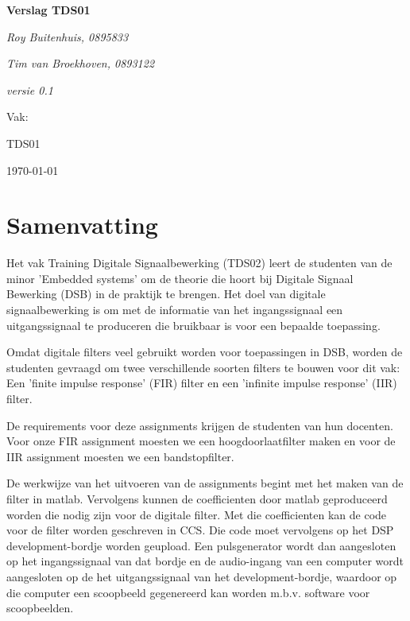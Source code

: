 \documentclass[11pt,a4paper]{article}
\def\auteureen{Roy Buitenhuis, 0895833}
\def\auteurtwee{Tim van Broekhoven, 0893122}
\def\titel{Verslag TDS01}
\def\datum{\today}
\def\versie{0.1}
\begin{document}
	
	\begin{titlepage}
		
		\centering
		{\huge\bfseries \titel \par}
		
		\vspace{1cm}
		{\Large\itshape \auteureen \par}
		{\Large\itshape \auteurtwee \par}
		\vspace{1cm}
		{\Large\itshape versie \versie\par}
				
		\vfill
		Vak:\par
		TDS01
		
		\vfill
		{\large \datum \par}
	\end{titlepage}

	\section{Samenvatting}

Het vak Training Digitale Signaalbewerking (TDS02) leert de studenten van de minor 'Embedded systems' om de theorie die hoort bij Digitale Signaal Bewerking (DSB) in de praktijk te brengen. Het doel van digitale signaalbewerking is om met de informatie van het ingangssignaal een uitgangssignaal te produceren die bruikbaar is voor een bepaalde toepassing. 

Omdat digitale filters veel gebruikt worden voor toepassingen in DSB, worden de studenten gevraagd om twee verschillende soorten filters te bouwen voor dit vak: Een 'finite impulse response' (FIR) filter en een 'infinite impulse response' (IIR) filter. 

De requirements  voor deze assignments krijgen de studenten van hun docenten. Voor onze FIR assignment moesten we een hoogdoorlaatfilter maken en voor de IIR assignment moesten we een bandstopfilter. 
	
De werkwijze van het uitvoeren van de assignments begint met het maken van de filter in matlab. Vervolgens kunnen de coefficienten door matlab geproduceerd worden die nodig zijn voor de digitale filter. Met die coefficienten kan de code voor de filter worden geschreven in CCS. Die code moet vervolgens op het DSP development-bordje worden geupload. Een pulsgenerator wordt dan aangesloten op het ingangssignaal van dat bordje en de audio-ingang van een computer wordt aangesloten op de het uitgangssignaal van het development-bordje, waardoor op die computer een scoopbeeld gegenereerd kan worden m.b.v. software voor scoopbeelden. 
\end{document}
